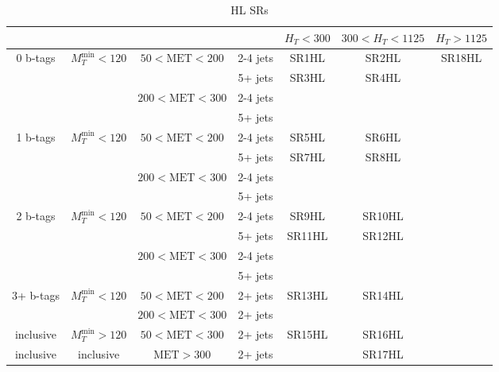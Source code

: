 \documentclass[plain,landscape]{article}
\begin{document}
\begin{table}
\renewcommand{\arraystretch}{1.3}
\centering
\begin{tabular}{|c|c|c|c|c|c|c|}
\hline
& & & & $H_T < 300$ & $300 < H_T < 1125$ & $H_T > 1125$  \\
\hline
\multirow{4}{*}{0 b-tags} &  \multirow{4}{*}{$M_T^{\textrm{min}} < 120$} & \multirow{2}{*}{$50 < \textrm{MET} < 200$} & 2-4 jets & SR1HL & SR2HL & \multirow{17}{*}{SR18HL} \\
\cline{4-6}
& & & 5+ jets & \multirow{3}{*}{SR3HL} & \multirow{3}{*}{SR4HL} & \\
\cline{3-4} 
& & \multirow{2}{*}{$200 < \textrm{MET} < 300$} &  2-4 jets & & & \\
\cline{4-4} 
& & & 5+ jets & & &  \\
\cline{1-6}
\multirow{4}{*}{1 b-tags} & \multirow{4}{*}{$M_T^{\textrm{min}} < 120$} & \multirow{2}{*}{ $50 < \textrm{MET} < 200$} & 2-4 jets & SR5HL & SR6HL & \\
\cline{4-6}
& & & 5+ jets & \multirow{3}{*}{SR7HL} & \multirow{3}{*}{SR8HL} & \\
\cline{3-4} 
& & \multirow{2}{*}{ $200 < \textrm{MET} < 300$} &  2-4 jets & &  & \\
\cline{4-4} 
& & & 5+ jets & & & \\
\cline{1-6}
\multirow{4}{*}{2 b-tags} & \multirow{4}{*}{$M_T^{\textrm{min}} < 120$} & \multirow{2}{*}{ $50 < \textrm{MET} < 200$} & 2-4 jets & SR9HL &  SR10HL  & \\
\cline{4-6}
& & & 5+ jets & \multirow{3}{*}{SR11HL} &  \multirow{3}{*}{SR12HL} &  \\
\cline{3-4} 
& & \multirow{2}{*}{ $200 <  \textrm{MET} < 300$} &  2-4 jets & & & \\
\cline{4-4}  
& & & 5+ jets & & & \\
\cline{1-6}
\multirow{2}{*}{3+ b-tags} & \multirow{2}{*}{$M_T^{\textrm{min}} < 120$}  & $50 < \textrm{MET} < 200$ & 2+ jets &  \multirow{2}{*}{SR13HL} &  \multirow{2}{*}{SR14HL} & \\
\cline{3-4} 
& & $200 < \textrm{MET} < 300$ & 2+ jets & & &  \\
\cline{1-6}
inclusive & $M_T^{\textrm{min}} > 120$ & $50 < \textrm{MET} < 300$  & 2+ jets & SR15HL & SR16HL & \\
\hline
inclusive & inclusive & $\textrm{MET} > 300$ & 2+ jets & \cellcolor{black} & \multicolumn{2}{|c|}{SR17HL}  \\
\hline
\end{tabular}
\caption{HL SRs}
\end{table}
\end{document}
